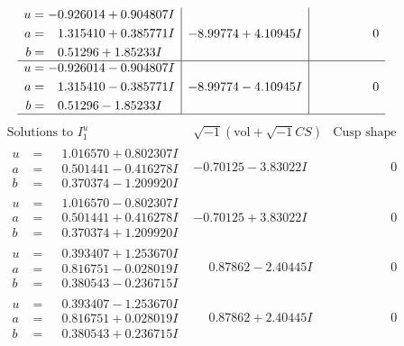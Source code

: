 \documentclass[1p]{elsarticle_modified}
\theoremstyle{definition}
\newcommand{\I}{\sqrt{-1}}
\begin{document}
$$\begin{array}{c|c|c}
\begin{aligned}
u &= -0.926014 + 0.904807 I \\
a &= \phantom{-}1.315410 + 0.385771 I \\
b &= \phantom{-}0.51296 + 1.85233 I\end{aligned}
 & -8.99774 + 4.10945 I & \phantom{-0.000000 } 0 \\ \hline\begin{aligned}
u &= -0.926014 - 0.904807 I \\
a &= \phantom{-}1.315410 - 0.385771 I \\
b &= \phantom{-}0.51296 - 1.85233 I\end{aligned}
 & -8.99774 - 4.10945 I & \phantom{-0.000000 } 0\\
 \hline 
 \end{array}$$\newpage$$\begin{array}{c|c|c}  
\text{Solutions to }I^u_{1}& \I (\text{vol} + \sqrt{-1}CS) & \text{Cusp shape}\\
 \hline 
\begin{aligned}
u &= \phantom{-}1.016570 + 0.802307 I \\
a &= \phantom{-}0.501441 - 0.416278 I \\
b &= \phantom{-}0.370374 - 1.209920 I\end{aligned}
 & -0.70125 - 3.83022 I & \phantom{-0.000000 } 0 \\ \hline\begin{aligned}
u &= \phantom{-}1.016570 - 0.802307 I \\
a &= \phantom{-}0.501441 + 0.416278 I \\
b &= \phantom{-}0.370374 + 1.209920 I\end{aligned}
 & -0.70125 + 3.83022 I & \phantom{-0.000000 } 0 \\ \hline\begin{aligned}
u &= \phantom{-}0.393407 + 1.253670 I \\
a &= \phantom{-}0.816751 - 0.028019 I \\
b &= \phantom{-}0.380543 - 0.236715 I\end{aligned}
 & \phantom{-}0.87862 - 2.40445 I & \phantom{-0.000000 } 0 \\ \hline\begin{aligned}
u &= \phantom{-}0.393407 - 1.253670 I \\
a &= \phantom{-}0.816751 + 0.028019 I \\
b &= \phantom{-}0.380543 + 0.236715 I\end{aligned}
 & \phantom{-}0.87862 + 2.40445 I & \phantom{-0.000000 } 0 \\ \hline\begin{aligned}

\end{aligned}
\end{array}$$
\end{document}

